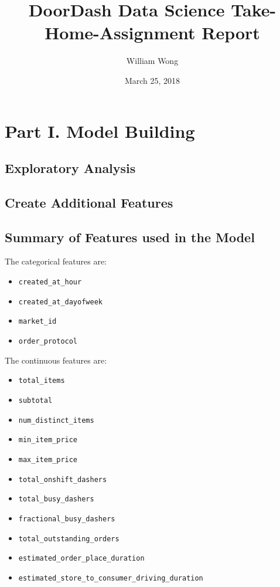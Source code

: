 \documentclass[12pt]{article}
\begin{document}
\title{DoorDash Data Science Take-Home-Assignment Report}

\author{William Wong}
\date{March 25, 2018}

\maketitle









\section{Part I. Model Building}


\subsection{Exploratory Analysis}


\subsection{Create Additional Features}


\subsection{Summary of Features used in the Model}
The categorical features are:
\begin{itemize}
  \item \texttt{created\_at\_hour}
  \item \texttt{created\_at\_dayofweek}
  \item \texttt{market\_id}
  \item \texttt{order\_protocol}
\end{itemize}


The continuous features are:
\begin{itemize}
  \item \texttt{total\_items}
  \item \texttt{subtotal}
  \item \texttt{num\_distinct\_items}
  \item \texttt{min\_item\_price}
  \item \texttt{max\_item\_price}
  \item \texttt{total\_onshift\_dashers}
  \item \texttt{total\_busy\_dashers}
  \item \texttt{fractional\_busy\_dashers}
  \item \texttt{total\_outstanding\_orders}
  \item \texttt{estimated\_order\_place\_duration}
  \item \texttt{estimated\_store\_to\_consumer\_driving\_duration}
\end{itemize}
\end{document}
